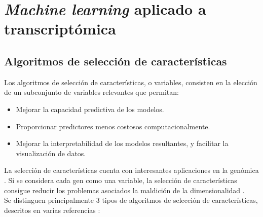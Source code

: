 \chapter{\textit{Machine learning} aplicado a transcriptómica}

\section{Algoritmos de selección de características}

Los algoritmos de selección de características, o variables, consisten en la elección de un subconjunto de variables relevantes que permitan:

\begin{itemize}
	\item Mejorar la capacidad predictiva de los modelos.
	\item Proporcionar predictores menos costosos computacionalmente.
	\item Mejorar la interpretabilidad de los modelos resultantes, y facilitar la visualización de datos.
\end{itemize} 

La selección de características cuenta con interesantes aplicaciones en la genómica \cite{Xing, Tadist2019}. Si se considera cada gen como una variable, la selección de características consigue reducir los problemas asociados la maldición de la dimensionalidad \cite{Bellman1957, Bellman1961}. \\

Se distinguen principalmente 3 tipos de algoritmos de selección de características, descritos en varias referencias \cite{HerreraMaldonado2020, Tadist2019}:

